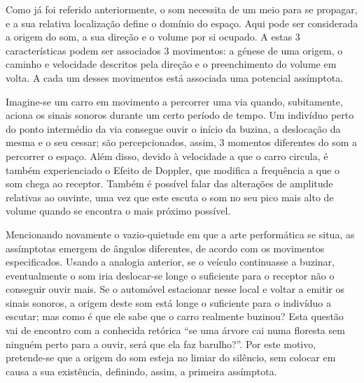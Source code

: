 \documentclass[../main.tex]{subfiles}
\begin{document}

Como já foi referido anteriormente, o som necessita de um meio para se propagar, e a sua relativa localização define o domínio do espaço. Aqui pode ser considerada a origem do som, a sua direção e o volume por si ocupado. A estas 3 características podem ser associados 3 movimentos: a génese de uma origem, o caminho e velocidade descritos pela direção e o preenchimento do volume em volta. A cada um desses movimentos está associada uma potencial assímptota.

Imagine-se um carro em movimento a percorrer uma via quando, subitamente, aciona os sinais sonoros durante um certo período de tempo. Um indivíduo perto do ponto intermédio da via consegue ouvir o início da buzina, a deslocação da mesma e o seu cessar; são percepcionados, assim, 3 momentos diferentes do som a percorrer o espaço. Além disso, devido à velocidade a que o carro circula, é também experienciado o Efeito de Doppler, que modifica a frequência a que o som chega ao receptor\cite{united1969principles}. Também é possível falar das alterações de amplitude relativas ao ouvinte, uma vez que este escuta o som no seu pico mais alto de volume quando se encontra o mais próximo possível.

Mencionando novamente o vazio-quietude em que a arte performática se situa, as assímptotas emergem de ângulos diferentes, de acordo com os movimentos especificados. Usando a analogia anterior, se o veículo continuasse a buzinar, eventualmente o som iria deslocar-se longe o suficiente para o receptor não o conseguir ouvir mais. Se o automóvel estacionar nesse local e voltar a emitir os sinais sonoros, a origem deste som está longe o suficiente para o indivíduo a escutar; mas como é que ele sabe que o carro realmente buzinou? Esta questão vai de encontro com a conhecida retórica \enquote{se uma árvore cai numa floresta sem ninguém perto para a ouvir, será que ela faz barulho?}. Por este motivo, pretende-se que a origem do som esteja no limiar do silêncio, sem colocar em causa a sua existência, definindo, assim, a primeira assímptota.
\end{document}
